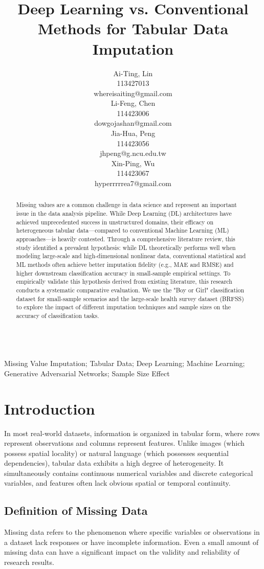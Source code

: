 \documentclass[twocolumn, 9pt]{extarticle}
\title{\sffamily\fontsize{18}{20}\bfseries Deep Learning vs. Conventional Methods for Tabular Data Imputation}
\author{
    \begin{minipage}{0.45\textwidth}
        \centering\sffamily
        \fontsize{12}{16}\selectfont 
        Ai-Ting, Lin\\
        \vspace{-0.5em} %
        113427013\\
        whereisaiting@gmail.com
    \end{minipage}\hfill
    \begin{minipage}{0.45\textwidth}
        \centering\sffamily
        \fontsize{12}{16}\selectfont 
        Li-Feng, Chen\\
        \vspace{-0.5em}
        114423006\\
        dowgojashan@gmail.com
    \end{minipage}
    
    \vspace{3ex} %
    
    \begin{minipage}{0.45\textwidth}
        \centering\sffamily
        \fontsize{12}{16}\selectfont 
        Jia-Hua, Peng\\
        \vspace{-0.5em}
        114423056\\
        jhpeng@g.ncu.edu.tw
    \end{minipage}\hfill
    \begin{minipage}{0.45\textwidth}
        \centering\sffamily
        \fontsize{12}{16}\selectfont 
        Xin-Ping, Wu\\
        \vspace{-0.5em}
        114423067\\
        hyperrrrrea7@gmail.com
    \end{minipage}
}
\date{} %
\date{}
\begin{document}
\maketitle

\begin{abstract}
Missing values are a common challenge in data science and represent an important issue in the data analysis pipeline. While Deep Learning (DL) architectures have achieved unprecedented success in unstructured domains, their efficacy on heterogeneous tabular data—compared to conventional Machine Learning (ML) approaches—is heavily contested. Through a comprehensive literature review, this study identified a prevalent hypothesis: while DL theoretically performs well when modeling large-scale and high-dimensional nonlinear data, conventional statistical and ML methods often achieve better imputation fidelity (e.g., MAE and RMSE) and higher downstream classification accuracy in small-sample empirical settings. To empirically validate this hypothesis derived from existing literature, this research conducts a systematic comparative evaluation. We use the "Boy or Girl" classification dataset for small-sample scenarios and the large-scale health survey dataset (BRFSS) to explore the impact of different imputation techniques and sample sizes on the accuracy of classification tasks.
\end{abstract}

\vspace{0.35em}
 \\ %
Missing Value Imputation; Tabular Data; Deep Learning; Machine Learning; Generative Adversarial Networks; Sample Size Effect


\section{Introduction}
In most real-world datasets, information is organized in tabular form, where rows represent observations and columns represent features. Unlike images (which possess spatial locality) or natural language (which possesses sequential dependencies), tabular data exhibits a high degree of heterogeneity. It simultaneously contains continuous numerical variables and discrete categorical variables, and features often lack obvious spatial or temporal continuity. 

\subsection{Definition of Missing Data}
Missing data refers to the phenomenon where specific variables or observations in a dataset lack responses or have incomplete information. Even a small amount of missing data can have a significant impact on the validity and reliability of research results.
\end{document}
